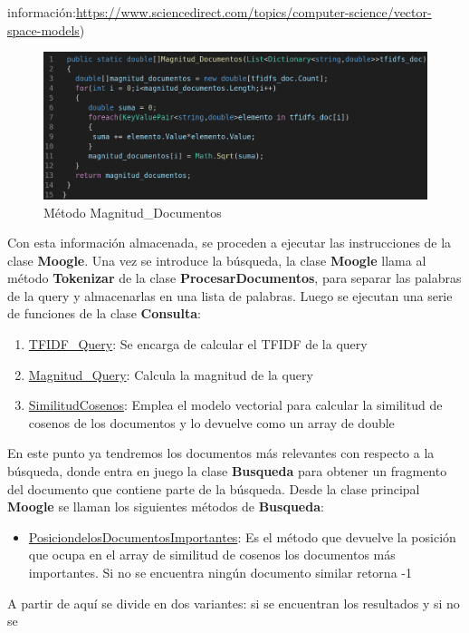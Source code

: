 \documentclass{article}
\begin{document}
\begin{enumerate}
      información:\url{https://www.sciencedirect.com/topics/computer-science/vector-space-models})  
  \begin{figure}[h]
    \centering
    \includegraphics[width = 15cm]{fig 3.png}
    \caption{Método Magnitud\_Documentos}
    \label{fig:3}
  \end{figure}    
 \end{enumerate}
 Con esta información almacenada, se proceden a ejecutar las instrucciones de la clase \textbf{Moogle}.
 Una vez se introduce la búsqueda, la clase \textbf{Moogle} llama al método \textbf{Tokenizar} de 
 la clase \textbf{ProcesarDocumentos}, para separar las palabras de la query y almacenarlas en
 una lista de palabras. Luego se ejecutan una serie de funciones de la clase \textbf{Consulta}:
 \begin{enumerate}
  \item \underline{TFIDF\_Query}: Se encarga de calcular el TFIDF de la query
  \item \underline{Magnitud\_Query}: Calcula la magnitud de la query
   \item \underline{SimilitudCosenos}: Emplea el modelo vectorial para calcular la similitud de
   cosenos de los documentos y lo devuelve como un array de double
 \end{enumerate}
 En este punto ya tendremos los documentos más relevantes con respecto a la búsqueda, donde entra
 en juego la clase \textbf{Busqueda} para obtener un fragmento del documento que contiene parte de
 la búsqueda. Desde la clase principal \textbf{Moogle} se llaman los siguientes métodos de
 \textbf{Busqueda}:
 \begin{itemize}
  \item \underline{PosiciondelosDocumentosImportantes}: Es el método que devuelve la posición que
  ocupa en el array de similitud de cosenos los documentos más importantes. Si no se encuentra
  ningún documento similar retorna -1 
 \end{itemize} 
 A partir de aquí se divide en dos variantes: si se encuentran los resultados y si no se
\end{document}
